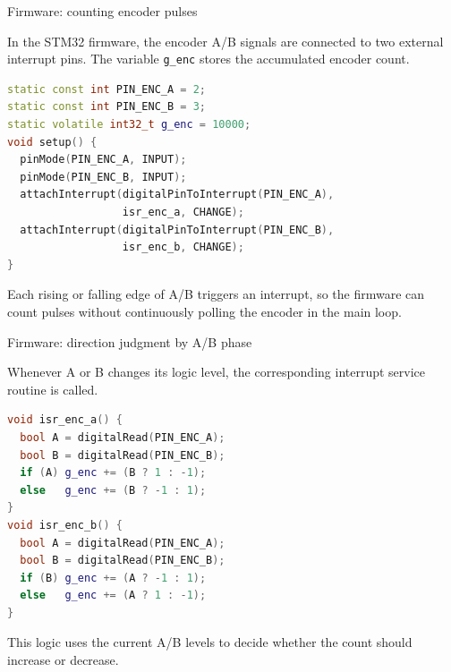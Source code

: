 \documentclass[aspectratio=169]{beamer}
\begin{document}
\begin{frame}[fragile]{Firmware: counting encoder pulses}

In the STM32 firmware, the encoder A/B signals are connected to two external interrupt pins.  
The variable \texttt{g\_enc} stores the accumulated encoder count.

\vspace{0.12cm}

\begin{lstlisting}[language=C++]
static const int PIN_ENC_A = 2; 
static const int PIN_ENC_B = 3;
static volatile int32_t g_enc = 10000;
void setup() {
  pinMode(PIN_ENC_A, INPUT);
  pinMode(PIN_ENC_B, INPUT);
  attachInterrupt(digitalPinToInterrupt(PIN_ENC_A),
                  isr_enc_a, CHANGE);
  attachInterrupt(digitalPinToInterrupt(PIN_ENC_B),
                  isr_enc_b, CHANGE);
}
\end{lstlisting}


Each rising or falling edge of A/B triggers an interrupt, so the firmware can count pulses without continuously polling the encoder in the main loop.

\end{frame}


\begin{frame}[fragile]{Firmware: direction judgment by A/B phase}

Whenever A or B changes its logic level, the corresponding interrupt service routine is called.



\begin{lstlisting}[language=C++]
void isr_enc_a() {
  bool A = digitalRead(PIN_ENC_A);
  bool B = digitalRead(PIN_ENC_B);
  if (A) g_enc += (B ? 1 : -1);
  else   g_enc += (B ? -1 : 1);
}
void isr_enc_b() {
  bool A = digitalRead(PIN_ENC_A);
  bool B = digitalRead(PIN_ENC_B);
  if (B) g_enc += (A ? -1 : 1);
  else   g_enc += (A ? 1 : -1);
}
\end{lstlisting}


This logic uses the current A/B levels to decide whether the count should increase or decrease.

\end{frame}
\end{document}
